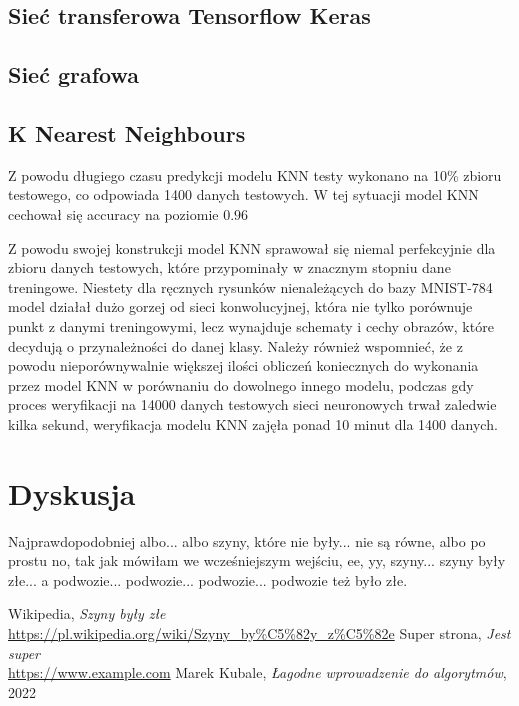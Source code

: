 \documentclass{article}
\begin{document}
\subsection{Sieć transferowa Tensorflow Keras}
\subsection{Sieć grafowa}
\subsection{K Nearest Neighbours}

Z powodu długiego czasu predykcji modelu KNN testy wykonano na 10\% zbioru testowego, co odpowiada 1400 danych testowych.
W tej sytuacji model KNN cechował się accuracy na poziomie $0.96$


Z powodu swojej konstrukcji model KNN sprawował się niemal perfekcyjnie 
dla zbioru danych testowych, które przypominały w znacznym stopniu 
dane treningowe. Niestety dla ręcznych rysunków nienależących do 
bazy MNIST-784 model działał dużo gorzej od sieci konwolucyjnej, 
która nie tylko porównuje punkt z danymi treningowymi, lecz 
wynajduje schematy i cechy obrazów, które decydują o 
przynależności do danej klasy. Należy również wspomnieć, 
że z powodu nieporównywalnie większej ilości obliczeń 
koniecznych do wykonania przez model KNN w porównaniu 
do dowolnego innego modelu, podczas gdy proces weryfikacji 
na 14000 danych testowych sieci neuronowych trwał zaledwie 
kilka sekund, weryfikacja modelu KNN zajęła ponad 10 minut dla 1400 danych.

\section{Dyskusja}

Najprawdopodobniej albo... albo szyny, 
które nie były... nie są równe, 
albo po prostu no, tak jak mówiłam we 
wcześniejszym wejściu, ee, yy, szyny... 
szyny były złe... a podwozie... podwozie... 
podwozie... podwozie też było złe. \cite{szyny}

\renewcommand{\refname}{Źródła}
\begin{thebibliography}{100}
     Wikipedia, 
    \textit{Szyny były złe} 
    \\\url{https://pl.wikipedia.org/wiki/Szyny_by%C5%82y_z%C5%82e}
     Super strona,
    \textit{Jest super}
    \\\url{https://www.example.com}
     Marek Kubale,
    \textit{Łagodne wprowadzenie do algorytmów}, 2022
\end{thebibliography}
\end{document}
